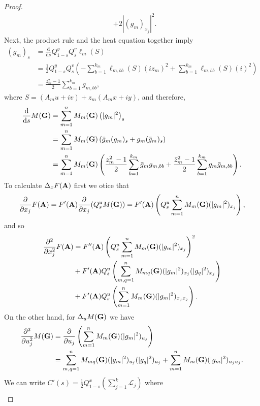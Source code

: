 \documentclass[10pt,a4paper]{amsart}
\begin{document}
\begin{proof}
\begin{align*}
			&  +2|(g_m)_{x_j}|^2.  
		\end{align*}
		Next, the product rule and the heat equation together imply
		\begin{align*}
			(g_m)_s&=\frac{\mathrm{d}}{\mathrm{d}s}Q_{1-s}^yQ_s^v\ell_m(S) \\
			&=\frac{1}{2}Q_{1-s}^yQ_s^v\left(-\sum_{b=1}^{k_m}\ell_{m,bb}(S)(iz_m)^2+\sum_{b=1}^{k_m}\ell_{m,bb}(S)(i)^2\right)\\
			&=\frac{z_m^2-1}{2}\sum_{b=1}^{k_m}g_{m,bb},
		\end{align*}
		where $S=( A_m u+iv)+z_m( A_m x+iy)$, and therefore, 
		\begin{align*}
			\frac{\mathrm{d}}{\mathrm{d}s}M({\bf{G}})&=\sum_{m=1}^nM_{m}({\bf{G}})\left(|g_m|^2\right)_s\\
			&=\sum_{m=1}^nM_{m}({\bf{G}})\left(\bar{g}_m(g_m)_s+g_m(\bar{g}_m)_s\right)\\
			&=\sum_{m=1}^nM_{m}({\bf{G}})\left(\frac{z^{2}_m-1}{2}\sum_{b=1}^{k_m}\bar{g}_mg_{m,bb}+\frac{\bar{z}^{2}_m-1}{2}\sum_{b=1}^{k_m}g_m\bar{g}_{m,bb}\right).
		\end{align*}
		To calculate $\Delta_xF({\bf{A}})$ first we otice that 
		\begin{equation*}
			\frac{\partial}{\partial x_j}F({\bf{A}})=F'({\bf{A}})	\frac{\partial}{\partial x_j}(Q_s^uM({\bf{G}}))=F'({\bf{A}})\left(Q_s^u\sum_{m=1}^nM_{m}({\bf{G}})(|g_m|^2)_{x_j}\right),
		\end{equation*}
		and so
		\begin{align*}
			\frac{\partial^2}{\partial x_j^2}F({\bf{A}})&=F''({\bf{A}})\left(Q_s^u\sum_{m=1}^nM_{m}({\bf{G}})(|g_m|^2)_{x_j}\right)^2\\
			&+F'({\bf{A}})Q_s^u\left(\sum_{m, q=1}^{n}M_{mq}({\bf{G}})(|g_m|^2)_{x_j}(|g_q|^2)_{x_j} \right)\\
			&+F'({\bf{A}})Q_s^u\left( \sum_{m=1}^nM_{m}({\bf{G}})(|g_m|^2)_{x_jx_j}\right).
		\end{align*}
		On the other hand, for $\Delta_uM({\bf{G}})$ we have
		\begin{align*}
			\frac{\partial^2}{\partial u_j^2}M({\bf{G}})&=\frac{\partial}{\partial u_j}\left(\sum_{m=1}^nM_{m}({\bf{G}})(|g_m|^2)_{u_j}\right)\\
			&=\sum_{m, q=1}^{n}M_{mq}({\bf{G}})(|g_m|^2)_{u_j}(|g_q|^2)_{u_j}+\sum_{m=1}^nM_{m}({\bf{G}})(|g_m|^2)_{u_ju_j}.
		\end{align*}
		We can write $C'(s)=\frac{1}{2}Q_{1-s}^x\left(\sum_{j=1}^k\mathcal{L}_j\right)$ where 
		\begin{align*}

\end{align*}
\end{proof}
\end{document}
